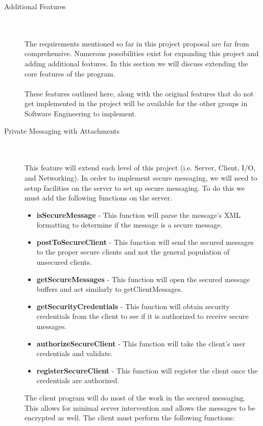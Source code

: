 \documentclass[11pt, letterpaper]{report}
\begin{document}
\begin{description}
\newpage
\hypertarget{Additional Features} {}
\item[\Large Additional Features] \hfill \\ \hfill \\
The requirements mentioned so far in this project proposal are far from comprehensive. Numerous possibilities exist for expanding this project and adding additional features. In this section we will discuss extending the core features of the program. \\ \\These features outlined here, along with the original features that do not get implemented in the project will be available for the other groups in Software Engineering to implement. 
\item[Private Messaging with Attachments] \hfill \\ \hfill \\
This feature will extend each level of this project (i.e. Server, Client, I/O, and Networking). In order to implement secure messaging, we will need to setup facilities on the server to set up secure messaging. To do this we must add the following functions on the server.
\begin{itemize}
\item \textbf{isSecureMessage} - This function will parse the message's XML formatting to determine if the message is a secure message.
\item \textbf{postToSecureClient} - This function will send the secured messages to the proper secure clients and not the general population of unsecured clients.
\item \textbf{getSecureMessages} - This function will open the secured message buffers and act similarly to getClientMessages.
\item \textbf{getSecurityCredentials} - This function will obtain security credentials from the client to see if it is authorized to receive secure messages.
\item \textbf{authorizeSecureClient} - This function will take the client's user credentials and validate.
\item \textbf{registerSecureClient} - This function will register the client once the credentials are authorized.
\end{itemize}
The client program will do most of the work in the secured messaging. This allows for minimal server intervention and allows the messages to be encrypted as well. The client must perform the following functions:
\begin{itemize}

\end{itemize}
\end{description}
\end{document}
